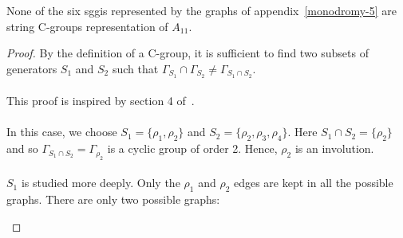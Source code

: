 \begin{lemma}
  \label{exclude-2}
  None of the six sggis represented by the graphs of appendix~\ref{monodromy-5} are string C-groups representation of $A_{11}$.
\end{lemma}

\begin{proof}
  By the definition of a C-group, it is sufficient to find two subsets of generators $S_1$ and $S_2$ such that $\Gamma_{S_1} \cap \Gamma_{S_2} \neq \Gamma_{S_1 \cap S_2}$.

  \paragraph{}
  This proof is inspired by section 4 of~\cite{leemansTransactions}.

  \paragraph{}
  In this case, we choose $S_1 = \{\rho_1, \rho_2\}$ and $S_2 = \{\rho_2, \rho_3, \rho_4\}$. Here $S_1 \cap S_2 = \{\rho_2\}$ and so $\Gamma_{S_1 \cap S_2} = \Gamma_{\rho_2}$ is a cyclic group of order 2. Hence, $\rho_2$ is an involution.

  \paragraph{}
  $S_1$ is studied more deeply. Only the $\rho_1$ and $\rho_2$ edges are kept in all the possible graphs. There are only two possible graphs:

  \begin{figure}[H]
    \begin{center}
\end{center}
\end{figure}
\end{proof}
